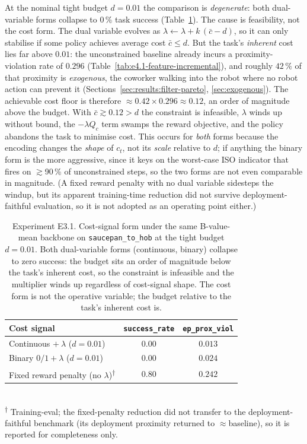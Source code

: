 \documentclass[11pt,a4paper]{report}
\begin{document}
At the nominal tight budget $d = 0.01$ the comparison is
\emph{degenerate}: both dual-variable forms collapse to $0\,\%$ task
success (Table~\ref{tab:e3.1-cost-signal}). The cause is feasibility,
not the cost form. The dual variable evolves as
$\lambda \leftarrow \lambda + k\,(\bar c - d)$, so it can only
stabilise if some policy achieves average cost $\bar c \le d$. But the
task's \emph{inherent} cost lies far above $0.01$: the unconstrained
baseline already incurs a proximity-violation rate of $0.296$
(Table~\ref{tab:e4.1-feature-incremental}), and roughly $42\,\%$ of
that proximity is \emph{exogenous}, the coworker walking into the robot
where no robot action can prevent it
(Sections~\ref{sec:results:filter-pareto}, \ref{sec:exogenous}). The
achievable cost floor is therefore
$\approx 0.42 \times 0.296 \approx 0.12$, an order of magnitude above
the budget. With $\bar c \gtrsim 0.12 > d$ the constraint is
infeasible, $\lambda$ winds up without bound, the $-\lambda Q_c$ term
swamps the reward objective, and the policy abandons the task to
minimise cost. This occurs for \emph{both} forms because the encoding
changes the \emph{shape} of $c_t$, not its \emph{scale} relative to
$d$; if anything the binary form is the more aggressive, since it keys
on the worst-case ISO indicator that fires on $\gtrsim$90\,\% of
unconstrained steps, so the two forms are not even comparable in
magnitude. (A fixed reward penalty with no dual variable sidesteps the
windup, but its apparent training-time reduction did not survive
deployment-faithful evaluation, so it is not adopted as an operating
point either.)

\begin{table}[h]
\centering
\caption{Experiment E3.1. Cost-signal form under the same
B-value-mean backbone on \texttt{saucepan\_to\_hob} at the tight
budget $d = 0.01$. Both dual-variable forms (continuous, binary)
collapse to zero success: the budget sits an order of magnitude below
the task's inherent cost, so the constraint is infeasible and the
multiplier winds up regardless of cost-signal shape. The cost form is
not the operative variable; the budget relative to the task's inherent
cost is.}
\label{tab:e3.1-cost-signal}
\small
\begin{tabular}{lcc}
\toprule
Cost signal & \texttt{success\_rate} & \texttt{ep\_prox\_viol} \\
\midrule
Continuous $+\ \lambda$ ($d{=}0.01$)   & $0.00$ & $0.013$ \\
Binary $0/1 + \lambda$ ($d{=}0.01$)    & $0.00$ & $0.024$ \\
Fixed reward penalty (no $\lambda$)\textsuperscript{$\dagger$}    & $0.80$ & $0.242$ \\
\bottomrule
\end{tabular}\\
\footnotesize\textsuperscript{$\dagger$} Training-eval; the
fixed-penalty reduction did not transfer to the deployment-faithful
benchmark (its deployment proximity returned to $\approx$baseline), so
it is reported for completeness only.
\end{table}
\end{document}
